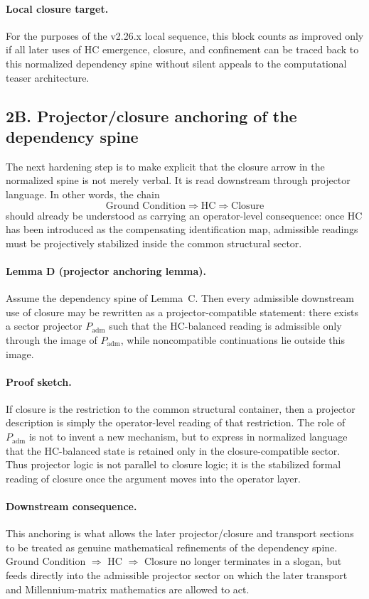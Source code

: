 \documentclass[12pt,a4paper]{article}
\begin{document}
\paragraph{Local closure target.}
For the purposes of the v2.26.x local sequence, this block counts as improved
only if all later uses of HC emergence, closure, and confinement can be traced
back to this normalized dependency spine without silent appeals to the
computational teaser architecture.

\subsection*{2B. Projector/closure anchoring of the dependency spine}
The next hardening step is to make explicit that the closure arrow in the
normalized spine is not merely verbal. It is read downstream through projector
language. In other words, the chain
\[
\text{Ground Condition} \Longrightarrow \text{HC} \Longrightarrow \text{Closure}
\]
should already be understood as carrying an operator-level consequence: once HC
has been introduced as the compensating identification map, admissible readings
must be projectively stabilized inside the common structural sector.

\paragraph{Lemma D (projector anchoring lemma).}
Assume the dependency spine of Lemma~C. Then every admissible downstream use of
closure may be rewritten as a projector-compatible statement: there exists a
sector projector $P_{\mathrm{adm}}$ such that the HC-balanced reading is
admissible only through the image of $P_{\mathrm{adm}}$, while noncompatible
continuations lie outside this image.

\paragraph{Proof sketch.}
If closure is the restriction to the common structural container, then a
projector description is simply the operator-level reading of that restriction.
The role of $P_{\mathrm{adm}}$ is not to invent a new mechanism, but to express
in normalized language that the HC-balanced state is retained only in the
closure-compatible sector. Thus projector logic is not parallel to closure
logic; it is the stabilized formal reading of closure once the argument moves
into the operator layer.

\paragraph{Downstream consequence.}
This anchoring is what allows the later projector/closure and transport sections
to be treated as genuine mathematical refinements of the dependency spine.
Ground Condition $\Rightarrow$ HC $\Rightarrow$ Closure no longer terminates in
a slogan, but feeds directly into the admissible projector sector on which the
later transport and Millennium-matrix mathematics are allowed to act.
\end{document}
